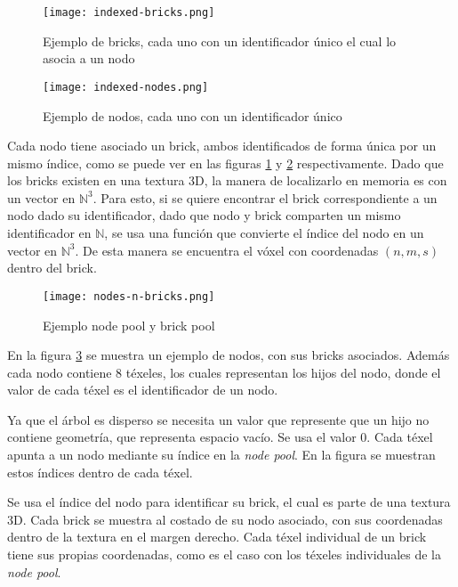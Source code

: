\begin{figure}[h!]
    \centering
    \texttt{[image: indexed-bricks.png]}
    \caption{Ejemplo de bricks, cada uno con un identificador único el cual lo asocia a un nodo}
    \label{fig:indexed_bricks}
\end{figure}

\begin{figure}[h!]
    \centering
    \texttt{[image: indexed-nodes.png]}
    \caption{Ejemplo de nodos, cada uno con un identificador único}
    \label{fig:indexed_nodes}
\end{figure}

Cada nodo tiene asociado un brick, ambos identificados de forma única por un mismo índice, como se puede ver en las figuras \ref{fig:indexed_bricks} y \ref{fig:indexed_nodes} respectivamente.
Dado que los bricks existen en una textura 3D, la manera de localizarlo en memoria es con un vector en $\mathbb{N}^3$.
Para esto, si se quiere encontrar el brick correspondiente a un nodo dado su identificador, dado que nodo y brick comparten un mismo identificador en $\mathbb{N}$, se usa una función que convierte el índice del nodo en un vector en $\mathbb{N}^3$.
De esta manera se encuentra el vóxel con coordenadas $(n, m, s)$ dentro del brick.

\begin{figure}[h!]
    \centering
    \texttt{[image: nodes-n-bricks.png]}
    \caption{Ejemplo node pool y brick pool}
    \label{fig:nodes_n_bricks}
\end{figure}

En la figura \ref{fig:nodes_n_bricks} se muestra un ejemplo de nodos, con sus bricks asociados.
Además cada nodo contiene $8$ téxeles, los cuales representan los hijos del nodo, donde el valor de cada téxel es el identificador de un nodo.

Ya que el árbol es disperso se necesita un valor que represente que un hijo no contiene geometría, que representa espacio vacío.
Se usa el valor 0.
Cada téxel apunta a un nodo mediante su índice en la \textit{node pool}.
En la figura se muestran estos índices dentro de cada téxel.

Se usa el índice del nodo para identificar su brick, el cual es parte de una textura 3D.
Cada brick se muestra al costado de su nodo asociado, con sus coordenadas dentro de la textura en el margen derecho.
Cada téxel individual de un brick tiene sus propias coordenadas, como es el caso con los téxeles individuales de la \textit{node pool}.

